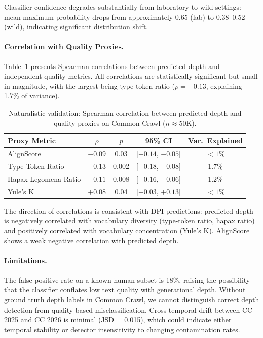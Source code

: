 \documentclass[11pt,a4paper]{article}
\begin{document}
Classifier confidence degrades substantially from laboratory to wild settings: mean maximum probability drops from approximately 0.65 (lab) to 0.38--0.52 (wild), indicating significant distribution shift.

\paragraph{Correlation with Quality Proxies.}
Table~\ref{tab:cc_correlation} presents Spearman correlations between predicted depth and independent quality metrics. All correlations are statistically significant but small in magnitude, with the largest being type-token ratio ($\rho = -0.13$, explaining 1.7\% of variance).

\begin{table}[h]
\centering
\caption{Naturalistic validation: Spearman correlation between predicted depth and quality proxies on Common Crawl ($n \approx 50$K).}
\label{tab:cc_correlation}
\small
\begin{tabular}{lcccc}
\toprule
\textbf{Proxy Metric} & \textbf{$\rho$} & \textbf{$p$} & \textbf{95\% CI} & \textbf{Var.~Explained} \\
\midrule
AlignScore & $-0.09$ & 0.03 & [$-0.14$, $-0.05$] & $<1\%$ \\
Type-Token Ratio & $-0.13$ & 0.002 & [$-0.18$, $-0.08$] & 1.7\% \\
Hapax Legomena Ratio & $-0.11$ & 0.008 & [$-0.16$, $-0.06$] & 1.2\% \\
Yule's K & $+0.08$ & 0.04 & [$+0.03$, $+0.13$] & $<1\%$ \\
\bottomrule
\end{tabular}
\end{table}

The direction of correlations is consistent with DPI predictions: predicted depth is negatively correlated with vocabulary diversity (type-token ratio, hapax ratio) and positively correlated with vocabulary concentration (Yule's K). AlignScore shows a weak negative correlation with predicted depth.

\paragraph{Limitations.}
The false positive rate on a known-human subset is 18\%, raising the possibility that the classifier conflates low text quality with generational depth. Without ground truth depth labels in Common Crawl, we cannot distinguish correct depth detection from quality-based misclassification. Cross-temporal drift between CC 2025 and CC 2026 is minimal (JSD = 0.015), which could indicate either temporal stability or detector insensitivity to changing contamination rates.
\end{document}
